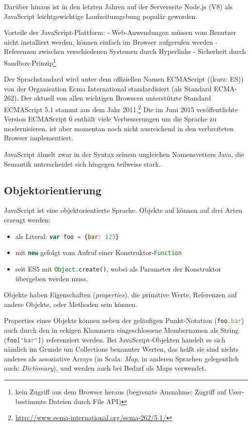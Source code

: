 \documentclass[a4paper, 12pt, hidelinks, listof=totoc, listoftables=totoc, bibliography=totoc]{scrreprt}
\newcommand{\code}[1]{\lstinline[language=Scala, style=inline]|#1|}
\newcommand{\js}[1]{\lstinline[language=JavaScript, style=inline]|#1|}
\begin{document}
Darüber hinaus ist in den letzten Jahren auf der Serverseite Node.js (V8) als JavaScript leichtgewichtige Laufzeitumgebung populär geworden.

Vorteile der JavaScript-Plattform:
- Web-Anwendungen müssen vom Benutzer nicht installiert werden, können einfach im Browser aufgerufen werden
- Referenzen zwischen verschiedenen Systemen durch Hyperlinks
- Sicherheit durch Sandbox-Prinzip\footnote{kein Zugriff aus dem Browser heraus (begrenzte Ausnahme: Zugriff auf User-bestimmte Dateien durch File API)}
\cite[\#Javascript-the-platform]{haoyi.HOS}








Der Sprachstandard wird unter dem offiziellen Namen ECMAScript ((kurz: ES)) von der Organisation Ecma International standardisiert (als Standard ECMA-262). Der aktuell von allen wichtigen Browsern unterstützte Standard ECMAScript 5.1 stammt aus dem Jahr 2011.\footnote{\url{http://www.ecma-international.org/ecma-262/5.1/}}
Die im Juni 2015 veröffentlichte Version ECMAScript 6 enthält viele Verbesserungen um die Sprache zu modernisieren, ist aber momentan noch nicht ausreichend in den verbreiteten Browser implementiert.


JavaScript ähnelt zwar in der Syntax seinem ungleichen Namensvetters Java, die Semantik unterscheidet sich hingegen teilweise stark\cite{eich1996.JSL}.


\subsection{Objektorientierung}

JavaScript ist eine objektorientierte Sprache. Objekte auf können auf drei Arten erzeugt werden:

\begin{itemize}
	\item als Literal: \js{var foo = {bar: 123}}
	\item mit \js{new} gefolgt vom Aufruf einer Konstruktor-\code{Function}
	\item seit ES5 mit \js{Object.create()}, wobei als Parameter der Konstruktor übergeben werden muss.
\end{itemize}

Objekte haben Eigenschaften (\textit{properties}), die primitive Werte, Referenzen auf andere Objekte, oder Methoden sein können.

Properties eines Objekts können neben der geläufigen Punkt-Notation (\js{foo.bar}) auch durch den in eckigen Klammern eingeschlossene Membernamen als String (\js{foo["bar"]}) referenziert werden. Bei JavaScript-Objekten handelt es sich nämlich im Grunde um Collections benannter Werten, das heißt sie sind nichts anderes als assoziative Arrays (in Scala: \textit{Map}, in anderen Sprachen gelegentlich auch: \textit{Dictionary}), und werden auch bei Bedarf als Maps verwendet.
\end{document}
